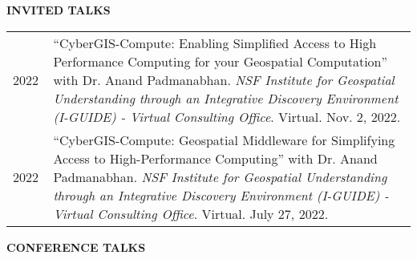 \documentclass{acmcv}
\begin{document}
\vspace*{0.25cm}

    \textbf{\uppercase{Invited Talks}}
    \vspace*{-0.35cm}

    \begin{longtable}{p{0.1\linewidth} p{0.9\linewidth}}

        2022 & ``CyberGIS-Compute: Enabling Simplified Access to High Performance Computing for your Geospatial Computation'' with Dr. Anand Padmanabhan. \textit{NSF Institute for Geospatial Understanding through an Integrative Discovery Environment (I-GUIDE) - Virtual Consulting Office}. Virtual. Nov. 2, 2022.\\

        2022 & ``CyberGIS-Compute: Geospatial Middleware for Simplifying Access to High-Performance Computing'' with Dr. Anand Padmanabhan. \textit{NSF Institute for Geospatial Understanding through an Integrative Discovery Environment (I-GUIDE) - Virtual Consulting Office}. Virtual. July 27, 2022. \\


    \end{longtable}
    \vspace*{-0.1cm}

	\textbf{\uppercase{Conference Talks}}
    \vspace*{-0.35cm}
\end{document}

